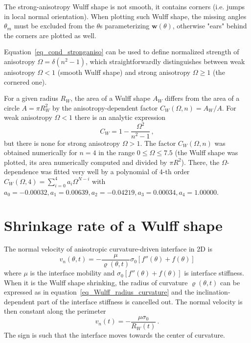	The strong-anisotropy Wulff shape is not smooth, it contains corners (i.e. jumps in local normal orientation). When plotting such Wulff shape, the missing angles $\theta_m$ must be excluded from the $\theta$s parameterizing $\bm{w}(\theta)$, otherwise "ears" behind the corners are plotted as well. 
	
	Equation~\eqref{eq_cond_stronganiso} can be used to define normalized strength of anisotropy $\Omega = \delta(n^2-1)$, which straightforwardly distinguishes between weak anisotropy $\Omega<1$ (smooth Wulff shape) and strong anisotropy $\Omega\geq1$ (the cornered one).
	
	For a given radius $R_W$, the area of a Wulff shape $A_W$ differs from the area of a circle $A=\pi R_W^2$ by the anisotropy-dependent factor $C_W(\Omega,n) = A_W/A$. For weak anisotropy $\Omega<1$ there is an analytic expression 
	\begin{equation}
		C_W = 1-\frac{\Omega^2}{n^2-1} \,,
	\end{equation}
	but there is none for strong anisotropy $\Omega>1$. The factor $C_W(\Omega,n)$ was obtained numerically for $n=4$ in the range $0\leq\Omega\leq7.5$ (the Wulff shape was plotted, its area numerically computed and divided by $\pi R^2$). There, the $\Omega$-dependence was fitted very well  by a polynomial of 4-th order $C_W(\Omega,4)= \sum_{i=0}^4a_i\Omega^{N-i}$ with $a_0=-0.00032 ,a_1=0.00639 ,a_2=-0.04219 , a_3=0.00034 , a_4=1.00000$. 
	
	\section{Shrinkage rate of a Wulff shape} \label{sec_appendix_wulff_shrrate}
	The normal velocity of anisotropic curvature-driven interface in 2D is~\cite{Abdeljawad2018}
	\begin{equation}
		v_n(\theta,t)=-\frac{\mu}{\varrho(\theta,t)}\sigma_0[f''(\theta) + f(\theta)] 
	\end{equation}
	where $\mu$ is the interface mobility and $\sigma_0[f''(\theta) + f(\theta)]$ is interface stiffness. When it is the
	Wulff shape shrinking, the radius of curvature $\varrho(\theta,t)$ can be expressed as in equation~\eqref{eq_Wulff_radius_curvature} and the inclination-dependent part of the interface stiffness is cancelled out. The normal velocity is then constant along the perimeter
	\begin{equation} \label{eq_wulff_norm_velocity}
		v_n(t) = - \frac{\mu \sigma_0}{R_W(t)} \,.
	\end{equation}
	The sign is such that the interface moves towards the center of curvature.
	
